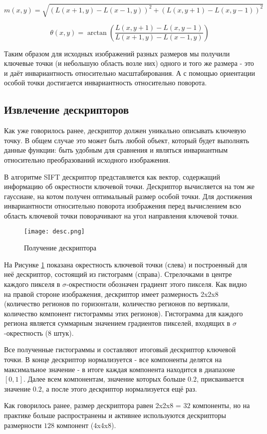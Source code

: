 \begin{equation} \label{eq:3}
    m(x,y)=\sqrt{(L(x+1,y) - L(x-1,y))^2 + (L(x,y+1) - L(x,y-1))^2}
\end{equation}

\begin{equation} \label{eq:4}
    \theta(x,y)=\arctan{\left(\frac{L(x,y+1) - L(x,y-1)}{L(x+1,y) - L(x-1,y)}\right)}
\end{equation}

Таким образом для исходных изображений разных размеров мы получили ключевые точки (и небольшую область возле них) одного и того же размера - это и даёт инвариантность относительно масштабирования. А с помощью ориентации особой точки достигается инвариантность относительно поворота.

\subsection{Извлечение дескрипторов}

Как уже говорилось ранее, дескриптор должен уникально описывать ключевую точку. В общем случае это может быть любой объект, который будет выполнять данные функции: быть удобным для сравнения и являться инвариантным относительно преобразований исходного изображения.

В алгоритме SIFT дескриптор представляется как вектор, содержащий информацию об окрестности ключевой точки. Дескриптор вычисляется на том же гауссиане, на котом получен оптимальный размер особой точки. Для достижения инвариантности относительно поворота изображения перед вычислением всю область ключевой точки поворачивают на угол направления ключевой точки.

\begin{figure}[h]
    \centering
    \texttt{[image: desc.png]}
    \caption{Получение дескриптора}
    \label{fig:desc}
\end{figure}

На Рисунке \ref{fig:desc} показана окрестность ключевой точки (слева) и построенный для неё дескриптор, состоящий из гистограмм (справа). Стрелочками в центре каждого пикселя в $\sigma$-окрестности обозначен градиент этого пикселя. Как видно на правой стороне изображения, дескриптор имеет размерность 2x2x8 (количество регионов по горизонтали, количество регионов по вертикали, количество компонент гистограммы этих регионов). Гистограмма для каждого региона является суммарным значением градиентов пикселей, входящих в $\sigma$-окрестность ($8$ штук).

Все полученные гистограммы и составляют итоговый дескриптор ключевой точки. В конце дескриптор нормализуется - все компоненты делятся на максимальное значение - в итоге каждая компонента находится в диапазоне $[0,1]$. Далее всем компонентам, значение которых больше $0.2$, присваивается значение $0.2$, а после этого дескриптор нормализуется ещё раз.

Как говорилось ранее, размер дескриптора равен 2x2x8 = $32$ компоненты, но на практике больше распространены и активнее используются дескрипторы размерности $128$ компонент (4x4x8).
